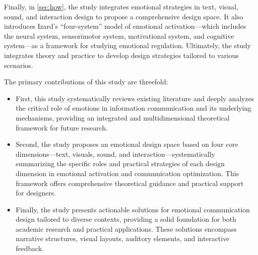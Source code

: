 Finally, in \cref{sec:how}, the study integrates emotional strategies in text, visual, sound, and interaction design to propose a comprehensive design space.  It also introduces Izard’s \cite{izard1993four} “four-system” model of emotional activation—which includes the neural system, sensorimotor system, motivational system, and cognitive system—as a framework for studying emotional regulation. Ultimately, the study integrates theory and practice to develop design strategies tailored to various scenarios.

The primary contributions of this study are threefold:
\begin{itemize}
    \item First, this study systematically reviews existing literature and deeply analyzes the critical role of emotions in information communication and its underlying mechanisms, providing an integrated and multidimensional theoretical framework for future research.
    \item Second, the study proposes an emotional design space based on four core dimensions—text, visuals, sound, and interaction—systematically summarizing the specific roles and practical strategies of each design dimension in emotional activation and communication optimization. This framework offers comprehensive theoretical guidance and practical support for designers.
    \item Finally, the study presents actionable solutions for emotional communication design tailored to diverse contexts, providing a solid foundation for both academic research and practical applications. These solutions encompass narrative structures, visual layouts, auditory elements, and interactive feedback.
\end{itemize}

